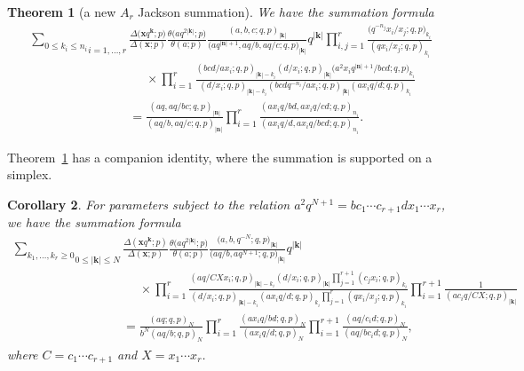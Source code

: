 \documentclass[pdftex]{sigma}%
\numberwithin{equation}{section}
\newtheorem{Theorem}{Theorem}[section]
\newtheorem{Corollary}[Theorem]{Corollary}
\def\ta{\theta}
\newcommand\bn{\mathbf n}
\newcommand\bk{\mathbf k}
\begin{document}
\begin{Theorem}[a new $A_r$ Jackson summation]\label{ijst}
We have the summation formula
\begin{gather}
\underset{i=1,\dots,r}{\sum_{0\le k_i\le n_i}}
\frac{\Delta\big(\mathbf x q^{\mathbf k};p\big)}{\Delta(\mathbf x;p)}
\frac{\ta\big(aq^{2|\bk|};p\big)}{\ta(a;p)}
\frac{(a,b,c;q,p)_{|\bk|}}{\big(aq^{|\bn|+1},aq/b,aq/c;q,p\big)_{|\bk|}}
q^{|\bk|}
\prod\limits_{i,j=1}^r\frac{\big(q^{-n_j}x_i/x_j;q,p\big)_{k_i}}{(qx_i/x_j;q,p)_{k_i}}\nonumber
\\ \phantom{\underset{i=1,\dots,r}{\sum_{0\le k_i\le n_i}}=}{}
\times
\prod\limits_{i=1}^r\frac{(bcd/ax_i;q,p)_{|\bk|-k_i} (d/x_i;q,p)_{|\bk|}
\big(a^2x_iq^{|\bn|+1}/bcd;q,p\big)_{k_i}}
{(d/x_i;q,p)_{|\bk|-k_i} (bcdq^{-n_i}/ax_i;q,p)_{|\bk|} (ax_iq/d;q,p)_{k_i}}\nonumber
\\ \phantom{\underset{i=1,\dots,r}{\sum_{0\le k_i\le n_i}}}{}
=\frac{(aq,aq/bc;q,p)_{|\bn|}}{(aq/b,aq/c;q,p)_{|\bn|}}
\prod_{i=1}^r\frac{(ax_iq/bd,ax_iq/cd;q,p)_{n_i}}{(ax_iq/d,ax_iq/bcd;q,p)_{n_i}}.\label{n87gl}
\end{gather}
\end{Theorem}

Theorem~\ref{ijst} has a companion identity, where the summation is supported on a simplex.
\begin{Corollary}\label{ijsc} For parameters subject to the relation
$a^2q^{N+1}=bc_1\dotsm c_{r+1}dx_1\dotsm x_r$,
we have the summation formula
\begin{gather}
\underset{0\le|\bk|\le N}{\sum_{k_1,\dots,k_r\ge 0}}
\frac{\Delta(\mathbf x q^{\mathbf k};p)}{\Delta(\mathbf x;p)}
\frac{\ta\big(aq^{2|\bk|};p\big)}{\ta(a;p)}
\frac{\big(a,b,q^{-N};q,p\big)_{|\bk|}}{\big(aq/b,aq^{N+1};q,p\big)_{|\bk|}} q^{|\bk|}\nonumber
\\ \phantom{\underset{0\le|\bk|\le N}{\sum_{k_1,\dots,k_r\ge 0}}=}{}
\times
\prod\limits_{i=1}^r\frac{(aq/CXx_i;q,p)_{|\bk|-k_i} (d/x_i;q,p)_{|\bk|}
\prod\limits_{j=1}^{r+1}(c_jx_i;q,p)_{k_i}}
{(d/x_i;q,p)_{|\bk|-k_i} (ax_iq/d;q,p)_{k_i}\prod\limits_{j=1}^r(qx_i/x_j;q,p)_{k_i}}
\prod\limits_{i=1}^{r+1}\frac 1{(ac_iq/CX;q,p)_{|\mathbf k|}}\nonumber
\\ \phantom{\underset{0\le|\bk|\le N}{\sum_{k_1,\dots,k_r\ge 0}}}{}
=\frac{(aq;q,p)_{N}}{b^N(aq/b;q,p)_{N}}
\prod\limits_{i=1}^r\frac{(ax_iq/bd;q,p)_{N}}{(ax_iq/d;q,p)_{N}}
\prod\limits_{i=1}^{r+1}\frac{(aq/c_id;q,p)_{N}}{(aq/bc_id;q,p)_{N}},\label{n87cgl}
\end{gather}
where $C=c_1\cdots c_{r+1}$ and $X=x_1\dotsm x_r$.
\end{Corollary}
\end{document}
